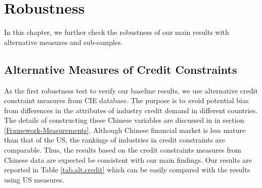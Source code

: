\documentclass[12pt]{article}
\begin{document}
\section{Robustness} \label{Robustness}

In this chapter, we further check the robustness of our main results with alternative measures and sub-samples.

\subsection{Alternative Measures of Credit Constraints}

As the first robustness test to verify our baseline results, we use alternative credit constraint measures from CIE database. The purpose is to avoid potential bias from differences in the attributes of industry credit demand in different countries. The details of constructing these Chinese variables are discussed in in section \ref{Framework-Measurements}. Although Chinese financial market is less mature than that of the US, the rankings of industries in credit constraints are comparable. Thus, the results based on the credit constraints measures from Chinese data are expected be consistent with our main findings. Our results are reported in Table \ref{tab.alt.credit} which can be easily compared with the results using US measures.
\end{document}
